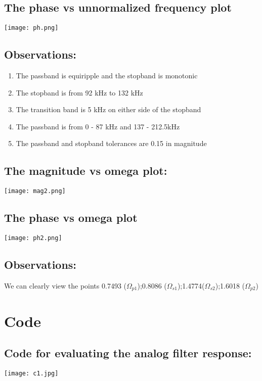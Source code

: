 \documentclass[12pt]{article}
\begin{document}
\subsection{The phase vs unnormalized frequency plot}
\begin{center}
\texttt{[image: ph.png]}
\end{center}
\subsection{Observations:}
\begin{enumerate}[noitemsep]
    \item {The passband is equiripple and the stopband is monotonic}
    \item {The stopband is from 92 kHz to 132 kHz}
    \item {The transition band is 5 kHz on either side of the stopband}
    \item {The passband is from 0 - 87 kHz and 137 - 212.5kHz}
    \item {The passband and stopband tolerances are 0.15 in magnitude}

\end{enumerate}
\subsection{The magnitude vs omega plot:}
\begin{center}
\texttt{[image: mag2.png]}
\end{center}
\subsection{The phase vs omega plot}
\begin{center}
\texttt{[image: ph2.png]}
\end{center}
\subsection{Observations:} We can clearly view the points 0.7493 ($\Omega_{p1}$);0.8086 ($\Omega_{s1}$);1.4774($\Omega_{s2}$);1.6018 ($\Omega_{p2}$)
\section{Code}
\subsection{Code for evaluating the analog filter response:}
\begin{center}
\texttt{[image: c1.jpg]}

\end{center}
\end{document}

